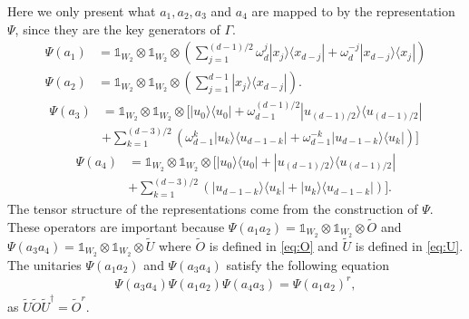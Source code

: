 \documentclass[11pt,letterpaper]{article}
\newcommand{\ketbra}[2]{|#1\rangle\langle#2|}
\newcommand{\x}{\otimes}
\newcommand{\ct}{^{\dagger}}
\newcommand{\C}{\mathbb{C}}
\newcommand{\calH}{\mathcal{H}}
\newcommand{\1}{\mathbb{1}}
\newcommand{\Pg}{\mathcal{P}}
\newcommand{\tO}{\tilde{O}}
\newcommand{\tU}{\tilde{U}}
\theoremstyle{definition}
\begin{document}
Here we only present what $a_1, a_2, a_3$ and $a_4$ are mapped to by the representation $\Psi$,
since they are the key generators of $\Gamma$.
\begin{align}
    \label{eq:o1} \Psi(a_1) &= \1_{W_2} \x \1_{W_2} \x \left(\sum_{j=1}^{(d-1)/2} \omega_d^j \ketbra{x_j}{x_{d-j}} + \omega_d^{-j} \ketbra{x_{d-j}}{x_{j}}\right) \\
    \label{eq:o2} \Psi(a_2) &= \1_{W_2} \x \1_{W_2} \x \left(\sum_{j=1}^{d-1} \ketbra{x_j}{x_{d-j}} \right).
\end{align}
\begin{equation}
    \begin{aligned}
    \label{eq:u1} \Psi(a_3) &= \1_{W_2} \x \1_{W_2} \x \Big[\ketbra{u_0}{u_0} +\omega_{d-1}^{(d-1)/2}\ketbra{u_{(d-1)/2}}{u_{(d-1)/2}}\\ 
    &+ \sum_{k=1}^{(d-3)/2}\left( \omega_{d-1}^k\ketbra{u_k}{u_{d-1-k}} + \omega_{d-1}^{-k}\ketbra{u_{d-1-k}}{u_k}\right) \Big]
    \end{aligned}
\end{equation}
\begin{equation}
    \begin{aligned}
    \label{eq:u2}\Psi(a_4) &= \1_{W_2} \x \1_{W_2} \x \Big[\ketbra{u_0}{u_0} +\ketbra{u_{(d-1)/2}}{u_{(d-1)/2}} \\
	& + \sum_{k=1}^{(d-3)/2}\left(\ketbra{u_{d-1-k}}{u_k} + \ketbra{u_k}{u_{d-1-k}}\right)\Big].
    \end{aligned}
\end{equation}
The tensor structure of the representations come from the construction of $\Psi$.
These operators are important because $\Psi(a_1a_2) = \1_{W_2} \x \1_{W_2} \x \tO$
and $\Psi(a_3a_4) = \1_{W_2} \x \1_{W_2} \x \tU$ where $\tO$ is defined in \cref{eq:O} and
$\tU$ is defined in \cref{eq:U}.
The unitaries $\Psi(a_1a_2)$ and $\Psi(a_3a_4)$ satisfy the following
equation
\begin{align*}
    \Psi(a_3a_4) \Psi(a_1a_2) \Psi(a_4a_3) = \Psi(a_1a_2)^r,
\end{align*}
as $\tU \tO \tU\ct = \tO^r$.



\end{document}
